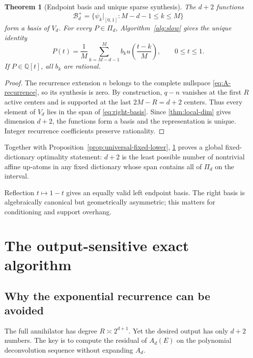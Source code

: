 \documentclass[11pt,oneside]{article}
\newtheorem{theorem}{Theorem}[section]
\theoremstyle{definition}
\theoremstyle{remark}
\newcommand{\Q}{\mathbb Q}
\begin{document}
\begin{theorem}[Endpoint basis and unique sparse synthesis]
\label{thm:endpoint-basis}
The $d+2$ functions
\begin{equation}
 \mathcal B_d^+=
 \{\psi_k|_{[0,1]}:M-d-1\le k\le M\}                     \label{eq:right-basis}
\end{equation}
form a basis of $V_d$.  For every $P\in\Pi_d$, Algorithm~\ref{alg:slow} gives the unique identity
\begin{equation}
 \boxed{
 P(t)=\frac1M\sum_{k=M-d-1}^{M}b_k
 u\!\left(\frac{t-k}{M}\right),\qquad0\le t\le1.}      \label{eq:endpoint-rep}
\end{equation}
If $P\in\Q[t]$, all $b_k$ are rational.
\end{theorem}

\begin{proof}
The recurrence extension $n$ belongs to the complete nullspace \eqref{eq:A-recurrence}, so its synthesis is zero.  By construction, $q-n$ vanishes at the first $R$ active centers and is supported at the last $2M-R=d+2$ centers.  Thus every element of $V_d$ lies in the span of \eqref{eq:right-basis}.  Since \cref{thm:local-dim} gives dimension $d+2$, the functions form a basis and the representation is unique.  Integer recurrence coefficients preserve rationality.
\end{proof}

Together with Proposition~\ref{prop:universal-fixed-lower}, \cref{thm:endpoint-basis} proves a global fixed-dictionary optimality statement: $d+2$ is the least possible number of nontrivial affine up-atoms in any fixed dictionary whose span contains all of $\Pi_d$ on the interval.

Reflection $t\mapsto1-t$ gives an equally valid left endpoint basis.  The right basis is algebraically canonical but geometrically asymmetric; this matters for conditioning and support overhang.

\section{The output-sensitive exact algorithm}
\label{sec:fast}

\subsection{Why the exponential recurrence can be avoided}
The full annihilator has degree $R\asymp2^{d+1}$.  Yet the desired output has only $d+2$ numbers.  The key is to compute the residual of $A_d(E)$ on the polynomial deconvolution sequence without expanding $A_d$.
\end{document}
